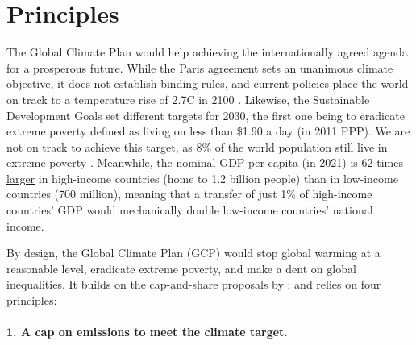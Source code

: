 \documentclass[12pt,english]{article}
\begin{document}
\section{Principles}\label{sec:principles}
The Global Climate Plan would help achieving the internationally agreed agenda for a prosperous future. While the Paris agreement sets an unanimous climate objective, it does not establish binding rules, and current policies place the world on track to a temperature rise of 2.7\textdegree{}C in 2100 \citep{climate_action_tracker_warming_2022}. Likewise, the Sustainable Development Goals set different targets for 2030, the first one being to eradicate extreme poverty defined as living on less than \$1.90 a day (in 2011 PPP). %
We are not on track to achieve this target, as 8\% of the world population still live in extreme poverty \citep{un_sustainable_2022}. Meanwhile, the nominal GDP per capita (in 2021) is \href{https://data.worldbank.org/indicator/NY.GDP.PCAP.CD?end=2021&locations=EU-ZG-XD-XM-1W-IN-US-CD-BI-LU-CN&start=2021&view=bar}{62 times larger} in high-income countries (home to 1.2 billion people) than in low-income countries (700 million), meaning that a transfer of just 1\% of high-income countries' GDP would mechanically double low-income countries' national income. 

By design, the Global Climate Plan (GCP) would stop global warming at a reasonable level, eradicate extreme poverty, and make a dent on global inequalities. It builds on the cap-and-share proposals by \citet{grubb_greenhouse_1990}; \citet{feasta_cap_2008} and relies on four principles:

\paragraph*{1. A cap on emissions to meet the climate target.} 
\end{document}
